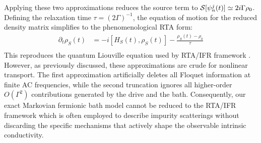 \documentclass[twocolumn, prx, reprint, amsfonts, amsmath, amssymb, longbibliography, floatfix, aps]{revtex4-2}
\begin{document}
Applying these two approximations reduces the source term to ${\cal S}[\psi^{j}_n (t)] \simeq 2i\Gamma \rho_0$. Defining the relaxation time $\tau = (2\Gamma)^{-1}$, the equation of motion for the reduced density matrix simplifies to the phenomenological RTA form:
\begin{equation}
    \begin{aligned}
        \partial_t \rho_S(t) &= -i[H_S(t), \rho_S(t)] - \frac{\rho_S(t) - \rho_0}{\tau} \\
    \end{aligned}
\end{equation}
This reproduces the quantum Liouville equation used by RTA/IFR framework \cite{das2023intrinsic}. However, as previously discussed, these approximations are crude for nonlinear transport. The first approximation artificially deletes all Floquet information at finite AC frequencies, while the second truncation ignores all higher-order $O(\Gamma^2)$ contributions generated by the drive and the bath. Consequently, our exact Markovian fermionic bath model cannot be reduced to the RTA/IFR framework which is often employed to describe impurity scatterings without discarding the specific mechanisms that actively shape the observable intrinsic conductivity.

\clearpage
\end{document}
